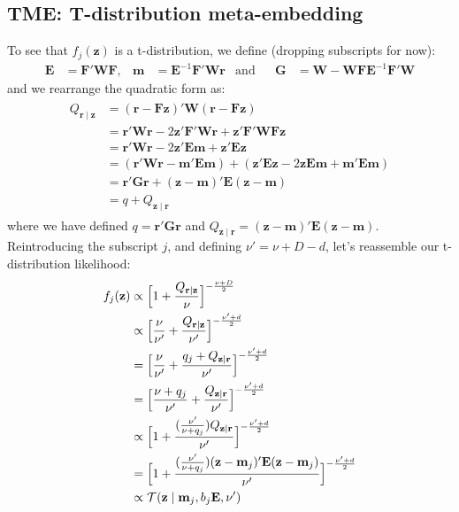 \documentclass[a4paper,oneside,12pt,english]{report}
\def\zvec{\mathbf{z}}
\def\Wmat{\mathbf{W}}
\def\Fmat{\mathbf{F}}
\def\Gmat{\mathbf{G}}
\def\Emat{\mathbf{E}}
\def\Gmat{\mathbf{G}}
\def\mvec{\mathbf{m}}
\def\rvec{\mathbf{r}}
\begin{document}
\subsection{TME: T-distribution meta-embedding}
\label{sec:TME}
To see that $f_j(\zvec)$ is a t-distribution, we define (dropping subscripts for now): 
\begin{align}
\label{eq:defBmuG}
\Emat &= \Fmat'\Wmat\Fmat,& \mvec &= \Emat^{-1}\Fmat'\Wmat\rvec& \text{and} && \Gmat &= \Wmat-\Wmat\Fmat\Emat^{-1}\Fmat'\Wmat 
\end{align}
and we rearrange the quadratic form as:
\begin{align}
\label{eq:rearrangeQ}
\begin{split}
Q_{\rvec\mid\zvec} &= (\rvec-\Fmat\zvec)'\Wmat(\rvec-\Fmat\zvec)\\ 
&= \rvec'\Wmat\rvec -2\zvec'\Fmat'\Wmat\rvec + \zvec'\Fmat'\Wmat\Fmat\zvec \\
&= \rvec'\Wmat\rvec -2\zvec'\Emat\mvec + \zvec'\Emat\zvec \\
&= (\rvec'\Wmat\rvec -\mvec'\Emat\mvec) + (\zvec'\Emat\zvec -2\zvec\Emat\mvec + \mvec'\Emat\mvec) \\
&= \rvec'\Gmat\rvec + (\zvec-\mvec)'\Emat(\zvec-\mvec) \\
&= q + Q_{\zvec\mid\rvec}
\end{split}
\end{align}
where we have defined $q=\rvec'\Gmat\rvec$ and $Q_{\zvec\mid\rvec}=(\zvec-\mvec)'\Emat(\zvec-\mvec)$. Reintroducing the subscript $j$, and defining $\nu'=\nu+D-d$, let's reassemble our t-distribution likelihood:
\begin{align}
\label{eq:TME}
\begin{split}
f_j(\zvec) &\propto \Bigl[1+\frac{Q_{\rvec\mid\zvec}}{\nu}\Bigr]^{-\frac{\nu+D}{2}} \\
&\propto\Bigl[\frac{\nu}{\nu'}+\frac{Q_{\rvec\mid\zvec}}{\nu'}\Bigr]^{-\frac{\nu'+d}{2}} \\
&= \Bigl[\frac{\nu}{\nu'}+\frac{q_j + Q_{\zvec\mid\rvec}}{\nu'}\Bigr]^{-\frac{\nu'+d}{2}} \\
&= \Bigl[\frac{\nu+q_j}{\nu'} + \frac{Q_{\zvec\mid\rvec}}{\nu'}\Bigr]^{-\frac{\nu'+d}{2}} \\
&\propto \Bigl[1 + \frac{(\frac{\nu'}{\nu+q_j})Q_{\zvec\mid\rvec}}{\nu'}\Bigr]^{-\frac{\nu'+d}{2}} \\
&= \Bigl[1 + \frac{(\frac{\nu'}{\nu+q_j})(\zvec-\mvec_j)'\Emat(\zvec-\mvec_j)}{\nu'}\Bigr]^{-\frac{\nu'+d}{2}} \\
&\propto\TD(\zvec\mid \mvec_j,b_j\Emat,\nu')
\end{split}
\end{align}
\end{document}
